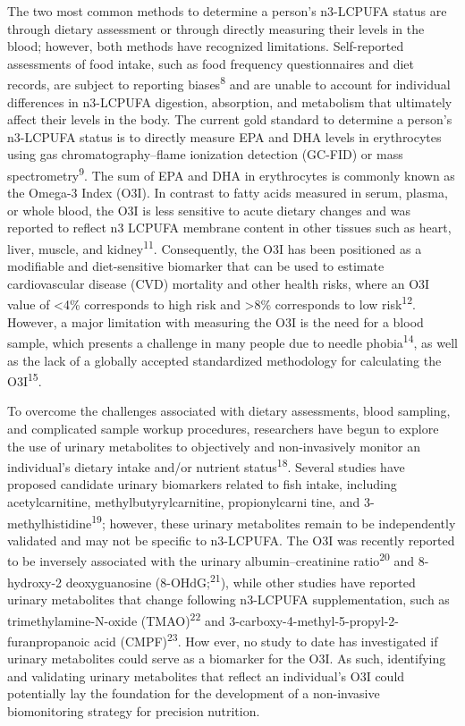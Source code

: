 \documentclass[journal=jacsat,manuscript=article]{achemso}
\begin{document}
The two most common methods to determine a person's n3-LCPUFA status are
through dietary assessment or through directly measuring their levels in
the blood; however, both methods have recognized limitations.
Self-reported assessments of food intake, such as food frequency
questionnaires and diet records, are subject to reporting
biases\textsuperscript{8} and are unable to account for individual
differences in n3-LCPUFA digestion, absorption, and metabolism that
ultimately affect their levels in the body. The current gold standard to
determine a person's n3-LCPUFA status is to directly measure EPA and DHA
levels in erythrocytes using gas chromatography--flame ionization
detection (GC-FID) or mass spectrometry\textsuperscript{9}. The sum of
EPA and DHA in erythrocytes is commonly known as the Omega-3 Index
(O3I). In contrast to fatty acids measured in serum, plasma, or whole
blood, the O3I is less sensitive to acute dietary changes and was
reported to reflect n3 LCPUFA membrane content in other tissues such as
heart, liver, muscle, and kidney\textsuperscript{11}. Consequently, the
O3I has been positioned as a modifiable and diet-sensitive biomarker
that can be used to estimate cardiovascular disease (CVD) mortality and
other health risks, where an O3I value of \textless4\% corresponds to
high risk and \textgreater8\% corresponds to low
risk\textsuperscript{12}. However, a major limitation with measuring the
O3I is the need for a blood sample, which presents a challenge in many
people due to needle phobia\textsuperscript{14}, as well as the lack of
a globally accepted standardized methodology for calculating the
O3I\textsuperscript{15}.

To overcome the challenges associated with dietary assessments, blood
sampling, and complicated sample workup procedures, researchers have
begun to explore the use of urinary metabolites to objectively and
non-invasively monitor an individual's dietary intake and/or nutrient
status\textsuperscript{18}. Several studies have proposed candidate
urinary biomarkers related to fish intake, including acetylcarnitine,
methylbutyrylcarnitine, propionylcarni tine, and
3-methylhistidine\textsuperscript{19}; however, these urinary
metabolites remain to be independently validated and may not be specific
to n3-LCPUFA. The O3I was recently reported to be inversely associated
with the urinary albumin--creatinine ratio\textsuperscript{20} and
8-hydroxy-2 deoxyguanosine (8-OHdG;\textsuperscript{21}), while other
studies have reported urinary metabolites that change following
n3-LCPUFA supplementation, such as trimethylamine-N-oxide
(TMAO)\textsuperscript{22} and
3-carboxy-4-methyl-5-propyl-2-furanpropanoic acid
(CMPF)\textsuperscript{23}. How ever, no study to date has investigated
if urinary metabolites could serve as a biomarker for the O3I. As such,
identifying and validating urinary metabolites that reflect an
individual's O3I could potentially lay the foundation for the
development of a non-invasive biomonitoring strategy for precision
nutrition.
\end{document}
